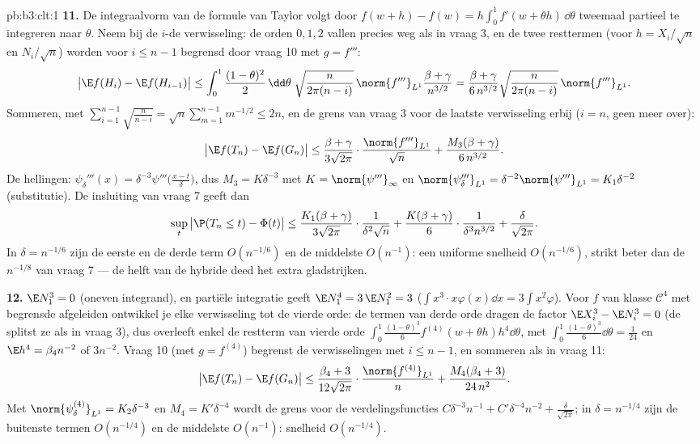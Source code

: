 \begin{solution}{pb:b3:clt:1}
\textbf{11.} De integraalvorm van de formule van Taylor
volgt door $f(w + h) - f(w) =
h\int_0^1f'(w + \theta h)\,\dd\theta$ tweemaal partieel te
integreren naar $\theta$. Neem  bij de
$i$-de verwisseling: de orden $0, 1, 2$ vallen precies weg
als in vraag 3, en de twee resttermen (voor $h = X_i/\sqrt
n$ en $N_i/\sqrt n$) worden voor $i \leq n - 1$ begrensd
door vraag 10 met $g = f'''$:
\[
\bigl|\E f(H_i) - \E f(H_{i-1})\bigr| \leq
\int_0^1\frac{(1-\theta)^2}2\,\dd\theta\;
\sqrt{\frac{n}{2\pi(n-i)}}\,\norm{f'''}_{L^1}
\frac{\beta + \gamma}{n^{3/2}}
= \frac{\beta + \gamma}{6\,n^{3/2}}
\sqrt{\frac{n}{2\pi(n-i)}}\,\norm{f'''}_{L^1} .
\]
Sommeren, met $\sum_{i=1}^{n-1}\sqrt{\frac n{n-i}} =
\sqrt n\sum_{m=1}^{n-1}m^{-1/2} \leq 2n$, en de grens van
vraag 3 voor de laatste verwisseling erbij ($i = n$, geen
 meer over):
\[
\bigl|\E f(T_n) - \E f(G_n)\bigr| \leq
\frac{\beta + \gamma}{3\sqrt{2\pi}}\cdot
\frac{\norm{f'''}_{L^1}}{\sqrt n} +
\frac{M_3(\beta + \gamma)}{6\,n^{3/2}} .
\]
De hellingen: $\psi_\delta'''(x) =
\delta^{-3}\psi'''\bigl(\frac{x - t}\delta\bigr)$, dus $M_3
= K\delta^{-3}$ met $K = \norm{\psi'''}_\infty$ en
$\norm{\psi_\delta'''}_{L^1} = \delta^{-2}
\norm{\psi'''}_{L^1} = K_1\delta^{-2}$ (substitutie). De
insluiting van vraag 7 geeft dan
\[
\sup_t\,\bigl|\P(T_n \leq t) - \Phi(t)\bigr| \leq
\frac{K_1(\beta + \gamma)}{3\sqrt{2\pi}}\cdot
\frac1{\delta^2\sqrt n} +
\frac{K(\beta + \gamma)}{6}\cdot
\frac1{\delta^3n^{3/2}} + \frac\delta{\sqrt{2\pi}} .
\]
In $\delta = n^{-1/6}$ zijn de eerste en de derde term
$O(n^{-1/6})$ en de middelste $O(n^{-1})$: een uniforme
snelheid $O(n^{-1/6})$, strikt beter dan de $n^{-1/8}$ van
vraag 7 --- de  helft van de hybride deed het
extra gladstrijken.

\textbf{12.} $\E N_1^3 = 0$ (oneven integrand), en partiële
integratie geeft $\E N_1^4 = 3\,\E N_1^2 = 3$
($\int x^3\cdot x\varphi(x)\dd x = 3\int x^2\varphi$). Voor
$f$ van klasse $\mathcal C^4$ met begrensde afgeleiden
ontwikkel je elke verwisseling tot de vierde orde: de
termen van derde orde dragen de factor $\E X_i^3 - \E N_i^3
= 0$ (de  splitst ze als in vraag 3), dus
overleeft enkel de restterm van vierde orde
$\int_0^1\frac{(1-\theta)^3}6f^{(4)}(w + \theta
h)h^4\dd\theta$, met $\int_0^1
\frac{(1-\theta)^3}6\dd\theta = \frac1{24}$ en $\E h^4 =
\beta_4n^{-2}$ of $3n^{-2}$. Vraag 10 (met $g = f^{(4)}$)
begrenst de verwisselingen met $i \leq n - 1$, en sommeren
als in vraag 11:
\[
\bigl|\E f(T_n) - \E f(G_n)\bigr| \leq
\frac{\beta_4 + 3}{12\sqrt{2\pi}}\cdot
\frac{\norm{f^{(4)}}_{L^1}}{n} +
\frac{M_4(\beta_4 + 3)}{24\,n^2} .
\]
Met $\norm{\psi_\delta^{(4)}}_{L^1} = K_2\delta^{-3}$ en
$M_4 = K'\delta^{-4}$ wordt de grens voor de
verdelingsfuncties $C\delta^{-3}n^{-1} + C'\delta^{-4}n^{-2}
+ \frac\delta{\sqrt{2\pi}}$; in $\delta = n^{-1/4}$ zijn de
buitenste termen $O(n^{-1/4})$ en de middelste $O(n^{-1})$:
snelheid $O(n^{-1/4})$.


\end{solution}
